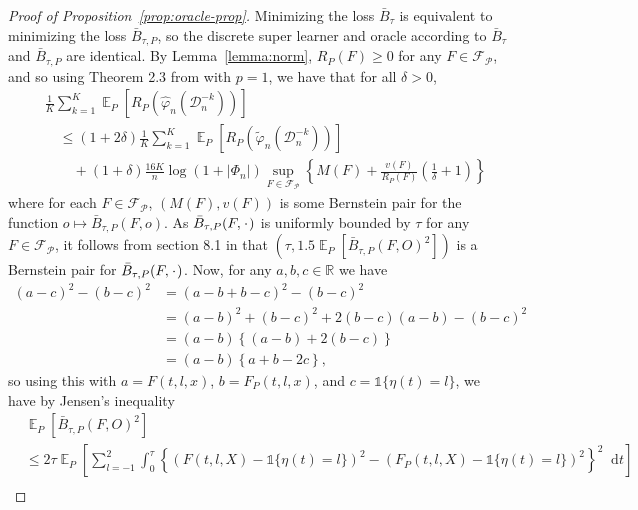 \documentclass[alpha-refs]{wiley-article}
\DeclareMathOperator{\E}{\mathbb{E}} %
\newcommand{\R}{\mathbb{R}}
\newcommand{\blank}{\makebox[1ex]{\textbf{$\cdot$}}}
\renewcommand{\phi}{\varphi}
\newcommand*\diff{\mathop{}\!\mathrm{d}}
\newcommand{\1}{\mathbb{1}}
\newcommand{\data}{\ensuremath{\mathcal{D}}}
\begin{document}
\begin{proof}[Proof of Proposition~\ref{prop:oracle-prop}]
  Minimizing the loss \( \bar{B}_{\tau} \) is equivalent to
  minimizing the loss \( \bar{B}_{\tau,P} \), so the discrete super learner and
  oracle according to \( \bar{B}_{\tau} \) and \( \bar{B}_{\tau,P} \) are
  identical. By Lemma~\ref{lemma:norm}, \( R_P(F) \geq 0 \) for any
  \( F \in \mathcal{F}_{\mathcal{P}} \), and so using Theorem 2.3 from
  \citep{vaart2006oracle} with \( p=1 \), we have that for all \( \delta >0 \),
\begin{align*}
  & \frac{1}{K} \sum_{k=1}^{K} \E_{P}{\left[ R_P(\hat{\phi}_n(\data_n^{-k})) \right]}
  \\
  &  \quad \leq
    (1+2\delta)\frac{1}{K} \sum_{k=1}^{K}\E_{P}{\left[ R_P(\tilde{\phi}_n(\data_n^{-k})) \right]}
  \\
  & \qquad + (1+\delta) \frac{16 K}{n}
    \log(1 + |\Phi_n|)\sup_{F \in \mathcal{F}_{\mathcal{P}}}
    \left\{
    M(F) + \frac{v(F)}{R_P(F)}
    \left(
    \frac{1}{\delta} + 1
    \right)
    \right\}
\end{align*}
where for each \( F \in \mathcal{F}_{\mathcal{P}} \),
\( (M(F), v(F)) \) is some Bernstein pair for the function
\(o \mapsto \bar{B}_{\tau,P}(F, o) \). As
\( \bar{B}_{\tau,P}(F, \blank) \) is uniformly bounded by \( \tau \)
for any \( F \in \mathcal{F}_{\mathcal{P}} \), it follows from section
8.1 in \citep{vaart2006oracle} that
\( (\tau, 1.5 \E_P{[\bar{B}_{\tau,P}(F, O)^2]}) \) is a Bernstein
pair for \( \bar{B}_{\tau,P}(F, \blank) \). Now, for any
\( a,b,c \in \R \) we have
\begin{align*}
  (a-c)^2 - (b-c)^2
  & = (a-b+b-c)^2 - (b-c)^2
  \\
  & = (a-b)^2 + (b-c)^2 +2(b-c)(a-b) - (b-c)^2
  \\
  & = (a-b)
    \left\{
    (a-b) +  2(b-c)
    \right\}
  \\
  & = (a-b)
    \left\{
     a + b -2c
    \right\},
\end{align*}
so using this with \( a=F(t, l, x) \), \( b=F_P(t, l, x) \), and
\( c = \1{\{\eta(t) = l\}} \), we have by Jensen's inequality
\begin{align*}
  & \E_P{[\bar{B}_{\tau,P}(F, O)^2]}
  \\
  & \leq
    2\tau\E_{P}{\left[
    \sum_{l=-1}^{2} \int_0^{\tau}
    \left\{
    \left(
    F(t, l, X) - \1{\{\eta(t) = l\}}
    \right)^2
    -
    \left(
    F_P(t, l, X) - \1{\{\eta(t) = l\}}
    \right)^2
    \right\}^2
    \diff t 
    \right]}
  \\

\end{align*}
\end{proof}
\end{document}
